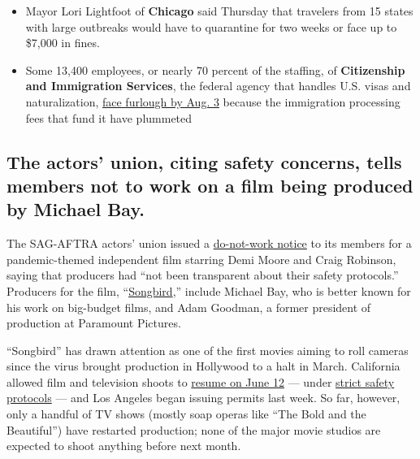 \begin{itemize}
{  about in-person voting} during the pandemic. About 40 percent of Mr.
  Biden's supporters said they would feel uncomfortable, compared with
  just 6 percent of Mr. Trump's supporters. Most of these people said
  they would go to the polls anyway, but 8 percent of Mr. Biden's
  surveyed supporters and less than 2 percent of Mr. Trump's said they
  would be too uncomfortable to go vote. Voting by mail for any reason
  is available in all six battleground states included in the
  Times/Siena data.
\item
  Mayor Lori Lightfoot of \textbf{Chicago} said Thursday that travelers
  from 15 states with large outbreaks would have to quarantine for two
  weeks or face up to \$7,000 in fines.
\item
  Some 13,400 employees, or nearly 70 percent of the staffing, of
  \textbf{Citizenship and Immigration Services}, the federal agency that
  handles U.S. visas and naturalization,
  \href{https://www.nytimes3xbfgragh.onion/2020/07/03/us/politics/immigration-furloughs-coronavirus.html}{face
  furlough by Aug. 3} because the immigration processing fees that fund
  it have plummeted
\end{itemize}

\hypertarget{the-actors-union-citing-safety-concerns-tells-members-not-to-work-on-a-film-being-produced-by-michael-bay}{%
\subsection{The actors' union, citing safety concerns, tells members not
to work on a film being produced by Michael
Bay.}\label{the-actors-union-citing-safety-concerns-tells-members-not-to-work-on-a-film-being-produced-by-michael-bay}}

The SAG-AFTRA actors' union issued a
\href{https://www.sagaftra.org/do-not-work-notice-songbird}{do-not-work
notice} to its members for a pandemic-themed independent film starring
Demi Moore and Craig Robinson, saying that producers had ``not been
transparent about their safety protocols.'' Producers for the film,
``\href{https://deadline.com/2020/05/michael-bay-adam-goodman-songbird-pandemic-themed-thriller-start-in-five-weeks-1202937906/}{Songbird},''
include Michael Bay, who is better known for his work on big-budget
films, and Adam Goodman, a former president of production at Paramount
Pictures.

``Songbird'' has drawn attention as one of the first movies aiming to
roll cameras since the virus brought production in Hollywood to a halt
in March. California allowed film and television shoots to
\href{https://www.latimes.com/entertainment-arts/business/story/2020-06-05/gavin-newsom-hollywood-production}{resume
on June 12} --- under
\href{https://www.latimes.com/entertainment-arts/business/story/2020-06-12/hollywood-reopening-rules-productions-covid-19-pandemic}{strict
safety protocols} --- and Los Angeles began issuing permits last week.
So far, however, only a handful of TV shows (mostly soap operas like
``The Bold and the Beautiful'') have restarted production; none of the
major movie studios are expected to shoot anything before next month.

